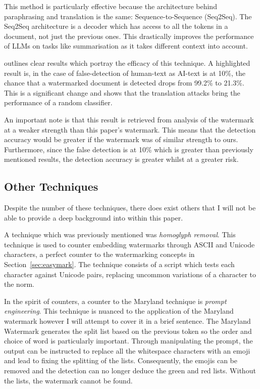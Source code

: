\documentclass{l4proj}
\theoremstyle{definition}
\begin{document}
        This method is particularly effective because the architecture behind paraphrasing and translation is the same: Sequence-to-Sequence (Seq2Seq). The Seq2Seq architecture is a decoder which has access to all the tokens in a document, not just the previous ones. This drastically improves the performance of LLMs on tasks like summarisation as it takes different context into account. 

        \citet{he2024watermarks} outlines clear results which portray the efficacy of this technique. A highlighted result is, in the case of false-detection of human-text as AI-text is at 10\%, the chance that a watermarked document is detected drops from 99.2\% to 21.3\%. This is a significant change and shows that the translation attacks bring the performance of a random classifier. 

        An important note is that this result is retrieved from analysis of the watermark at a weaker strength than this paper's watermark. This means that the detection accuracy would be greater if the watermark was of similar strength to ours. Furthermore, since the false detection is at 10\% which is greater than previously mentioned results, the detection accuracy is greater whilst at a greater risk.

    \subsection{Other Techniques}
        Despite the number of these techniques, there does exist others that I will not be able to provide a deep background into within this paper.

        A technique which was previously mentioned was \emph{homoglyph removal}. This technique is used to counter embedding watermarks through ASCII and Unicode characters, a perfect counter to the watermarking concepts in Section~\ref{sec:easymark}. The technique consists of a script which tests each character against Unicode pairs, replacing uncommon variations of a character to the norm. 

        In the spirit of counters, a counter to the Maryland technique is \emph{prompt engineering}. This technique is nuanced to the application of the Maryland watermark however I will attempt to cover it in a brief sentence. The Maryland Watermark generates the split list based on the previous token so the order and choice of word is particularly important. Through manipulating the prompt, the output can be instructed to replace all the whitespace characters with an emoji and lead to fixing the splitting of the lists. Consequently, the emojis can be removed and the detection can no longer deduce the green and red lists. Without the lists, the watermark cannot be found. 
\end{document}
